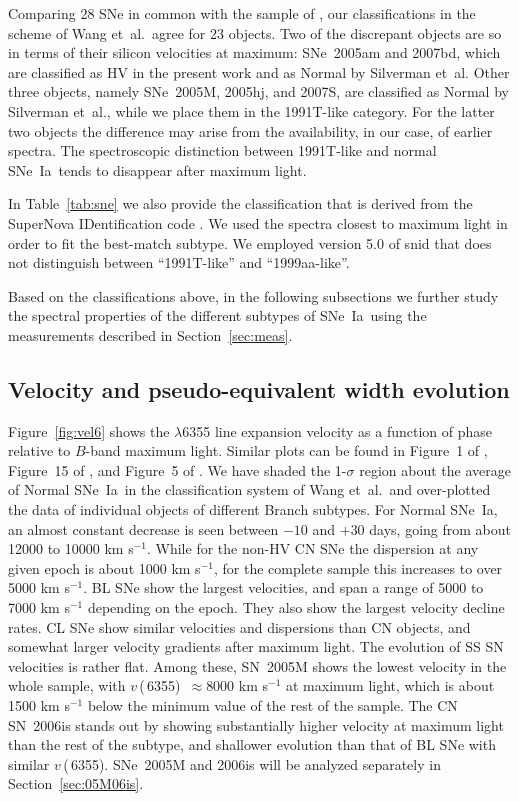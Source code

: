 \documentclass[apj]{emulateapj-rtx4}
\newcommand{\vsix}{$v$\,(\ion{Si}{2}\,6355)}
\newcommand{\sneia}{SNe~Ia}
\begin{document}
Comparing 28 SNe in common with the sample of
\citet{silverman12b}, our classifications in the scheme of Wang
  et~al.~agree for 23 objects. Two of the discrepant
objects are so in terms of their silicon velocities at maximum:
SNe~2005am and 2007bd, which are classified as HV in the present work
and as Normal by Silverman et~al. Other three objects, namely
SNe~2005M, 2005hj, and 2007S, are classified as
Normal by Silverman et~al., while we place them in the 1991T-like
category. For the latter two objects the difference may 
arise from the availability, in our case, of earlier spectra. The
spectroscopic distinction between 1991T-like and normal \sneia\ tends
to disappear after maximum light.

In Table~\ref{tab:sne} we also provide the classification that is
derived from the SuperNova IDentification code \citep[{\sc
    snid};][]{blondin07}. We used the spectra closest to maximum light
in order to fit the best-match 
subtype. We employed version 5.0 of {\sc snid} that does not distinguish
between ``1991T-like'' and ``1999aa-like''. 

Based on the classifications above, in the following subsections we
further study the spectral properties of the different subtypes of
\sneia\ using the measurements described in
Section~\ref{sec:meas}. 

\subsection{Velocity and pseudo-equivalent width evolution}
\label{sec:ewvelt}
 
Figure~\ref{fig:vel6} shows the  $\lambda$6355 line
expansion velocity as a function of phase relative to $B$-band maximum
light. Similar plots can be found in Figure~1 of \citet{foley11b},
Figure~15 of \citet{blondin12}, and Figure~5 of
\citet{silverman12b}. We have shaded the 1-$\sigma$ region about the
average of Normal \sneia\ in the classification system of Wang et~al.~and
over-plotted the data of individual objects of different Branch subtypes. For
Normal \sneia, an almost constant decrease is seen between 
$-10$ and $+30$ days, going from about 12000 to 10000 km
s$^{-1}$. While for the non-HV CN SNe the dispersion at any given
epoch is about 1000 km s$^{-1}$, for the complete sample this increases to 
over 5000 km s$^{-1}$. BL SNe show the largest velocities, and span a
range of 5000 to 7000 km s$^{-1}$ depending on the epoch. They also
show the largest velocity decline rates. CL SNe show similar
velocities and dispersions than CN objects, and somewhat larger
velocity gradients after maximum light. The evolution of SS SN 
velocities is rather flat. Among these, SN~2005M shows the lowest
velocity in the whole sample, with \vsix\ $\approx 8000$ km s$^{-1}$
at maximum light, which is about 1500 km s$^{-1}$ below the minimum
value of the rest of the sample. The CN SN~2006is stands out by showing
substantially higher  velocity at maximum light than the
rest of the subtype, and shallower evolution than that of BL SNe with
similar \vsix. SNe~2005M and 2006is will be analyzed separately in
Section~\ref{sec:05M06is}.
\end{document}
